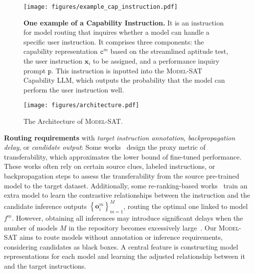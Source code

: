 \begin{figure*}[t]
    \centering
    \vspace{-10pt}
    \texttt{[image: figures/example\_cap\_instruction.pdf]}
    \caption{\textbf{One example of a Capability Instruction.} It is an instruction for model routing that inquires whether a model can handle a specific user instruction. It comprises three components: the capability representation $\texttt{c}^m$ based on the streamlined aptitude test, the user instruction $\mathbf{x}_i$ to be assigned, and a performance inquiry prompt $\texttt{p}$. This instruction is inputted into the \textsc{Model-SAT} Capability LLM, which outputs the probability that the model can perform the user instruction well.}
    \label{fig:capability_instruction}
    \vspace{-5pt}
\end{figure*}

\begin{figure}[t]
    \vspace{-10pt}
    \centering
    \texttt{[image: figures/architecture.pdf]}
    \caption{The Architecture of \textsc{Model-SAT}.}
    \label{fig:architecture}
    \vspace{-10pt}
\end{figure}

\textbf{Routing requirements} with \textit{target instruction annotation}, \textit{backpropagation delay}, or \textit{candidate output}: Some works~\cite{bao2019information,li2021ranking,DBLP:conf/icml/YouLWL21,deshpande2021linearized,DBLP:conf/cvpr/PandyAUFM22} design the proxy metric of transferability, which approximates the lower bound of fine-tuned performance. These works often rely on certain source clues, labeled instructions, or backpropagation steps to assess the transferability from the source pre-trained model to the target dataset.
Additionally, some re-ranking-based works~\cite{DBLP:journals/corr/abs-2311-06720,bge_embedding,zhang2024mgte} train an extra model to learn the contrastive relationships between the instruction and the candidate inference outputs $\left\{ \mathbf{o}^m_i \right\}_{m=1}^{M}$, routing the optimal one linked to model $f^m$.
However, obtaining all inferences may introduce significant delays when the number of models $M$ in the repository becomes excessively large~\cite{shnitzer2023large,lu2023routing,hu2024routerbench}.
Our \textsc{Model-SAT} aims to route models without annotation or inference requirements, considering candidates as black boxes.
A central feature is constructing model representations for each model and learning the adjusted relationship between it and the target instructions.

